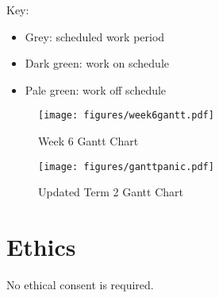 \documentclass{article}
\begin{document}
Key: 
\begin{itemize}
    \item Grey: scheduled work period
    \item Dark green: work on schedule
    \item Pale green: work off schedule
\end{itemize}

\begin{figure}
    \texttt{[image: figures/week6gantt.pdf]}
        \caption{Week 6 Gantt Chart}
        \label{fig:gantt}
\end{figure}

\begin{figure}
    \texttt{[image: figures/ganttpanic.pdf]}
        \caption{Updated Term 2 Gantt Chart}
        \label{fig:gantt}
\end{figure}

\section{Ethics}
No ethical consent is required.



\newpage

\end{document}
